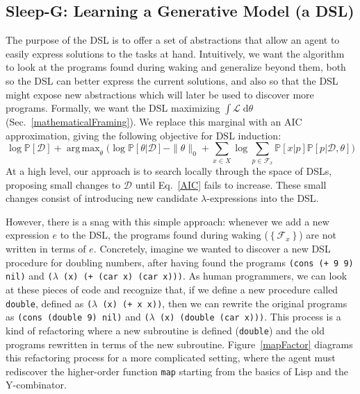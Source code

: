 \documentclass{article}
\newcommand{\lowerBound}{\mathscr{L}}
\newcommand{\code}[1]{{\footnotesize\texttt{#1}}}
\DeclareMathOperator*{\argmax}{arg\,max} %
\newcommand{\probability}{\mathds{P}} %
\begin{document}
\subsection{Sleep-G: Learning a Generative Model (a DSL)}\label{grammarInductionSection}

The purpose of the DSL is to
offer a set of abstractions
that allow an agent to easily express solutions to the tasks at hand.
Intuitively, we want the algorithm to look at the programs found
during waking and generalize beyond them, both so the DSL can better
express the current solutions, and also so that the DSL might expose
new abstractions which will later be used to discover more programs.
Formally, we want the DSL maximizing $\int \lowerBound\;\mathrm{d}\theta$ (Sec.~\ref{mathematicalFraming}).
We replace this marginal with an AIC approximation, giving the following objective for DSL induction:
\begin{equation}
        \log \probability[\mathcal{D}] + 
\argmax_{\theta}\Bigg(\log \probability[\theta|\mathcal{D}] - \|\theta\|_0 +\sum_{x\in X}\log \sum_{p\in \mathcal{F}_x}\probability[x|p]\probability[p|\mathcal{D},\theta]\Bigg)
\label{AIC}
  \end{equation}
At a high level, our approach is to search locally through the space 
of DSLs, proposing small changes to $\mathcal{D}$ until Eq.~\ref{AIC}
fails to increase.  These small changes consist of introducing new
candidate $\lambda$-expressions into the DSL.

However, there is a snag with this simple approach:
whenever we add a new expression $e$ to the DSL,
the programs found during waking ($\left\{\mathcal{F}_x \right\}$)
are not written in terms of $e$.
Concretely, imagine we wanted to discover a new DSL procedure for doubling numbers,
after having found the programs
\code{(cons (+ 9 9) nil)} and \code{($\lambda$ (x) (+ (car x) (car x)))}.
As human programmers,
we can look at these pieces of code and recognize that,
if we define a new procedure called \code{double},
defined as \code{($\lambda$ (x) (+ x x))},
then we can rewrite the original programs as
\code{(cons (double 9) nil)} and \code{($\lambda$ (x) (double (car x)))}.
This process is a kind of refactoring
where a new subroutine is defined (\code{double})
and the old programs rewritten
in terms of the new subroutine.
Figure~\ref{mapFactor}
diagrams this refactoring
process for a more complicated
setting,
where the agent must rediscover the higher-order function \code{map}
starting from the basics of Lisp and the Y-combinator.
\end{document}
